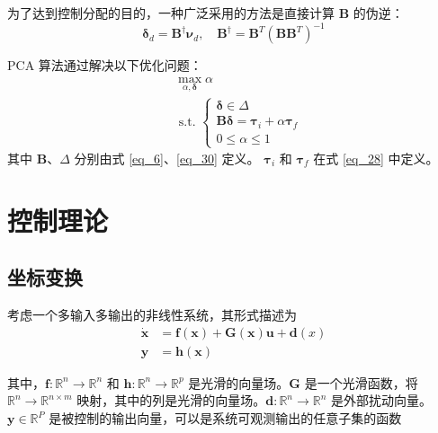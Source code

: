 为了达到控制分配的目的，一种广泛采用的方法是直接计算 $\boldsymbol{B}$ 的伪逆：
\begin{equation}
	{{\boldsymbol{\delta }}_d} = {{\boldsymbol{B}}^\dag }{{\boldsymbol{\nu }}_d},   \quad  {{\boldsymbol{B}}^\dag } = {{\boldsymbol{B}}^T}{\left( {{\boldsymbol{B}}{{\boldsymbol{B}}^T}} \right)^{ - 1}}
	\label{eq_32}
\end{equation}

PCA 算法通过解决以下优化问题：
\begin{equation}
	\begin{aligned}
	&\max _{\alpha, \boldsymbol{\delta}} \alpha\\
	&\text { s.t. }\left\{\begin{array}{l}
	\boldsymbol{\delta} \in \Delta \\
	\boldsymbol{B} \boldsymbol{\delta}=\boldsymbol{\tau}_{i}+\alpha \boldsymbol{\tau}_{f} \\
	0 \leq \alpha \leq 1
	\end{array}\right.
	\end{aligned}
	\label{eq_pca}
\end{equation}
其中 $ \boldsymbol{B} $、$ \Delta $ 分别由式 \eqref{eq_6}、\eqref{eq_30} 定义。 $ \boldsymbol{\tau}_{i} $ 和 $ \boldsymbol{\tau}_{f} $ 在式 \eqref{eq_28} 中定义。



\section{控制理论}

\subsection{坐标变换}
考虑一个多输入多输出的非线性系统，其形式描述为
\begin{equation}
  \begin{aligned}
    \dot{\boldsymbol{x}}&=\boldsymbol{f}(\boldsymbol{x})+\boldsymbol{G}(\boldsymbol{x})\boldsymbol{u} + \boldsymbol{d}(x)\\
    \boldsymbol{y}&=\boldsymbol{h}(\boldsymbol{x})
  \end{aligned}
  \label{system}
\end{equation}

其中，$\boldsymbol{f}: \mathbb{R}^{n}\to\mathbb{R}^{n}$ 和 $\boldsymbol{h}: \mathbb{R}^{n}\to\mathbb{R}^{p}$ 是光滑的向量场。$\boldsymbol{G}$ 是一个光滑函数，将 $\mathbb{R}^{n}\to\mathbb{R}^{n\times m}$ 映射，其中的列是光滑的向量场。$\boldsymbol{d}: \mathbb{R}^{n}\to\mathbb{R}^{n}$ 是外部扰动向量。$\boldsymbol{y}\in\mathbb{R}^{P}$ 是被控制的输出向量，可以是系统可观测输出的任意子集的函数

